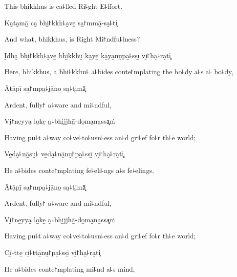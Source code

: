 \begin{english}
  This bhikkhus is ca꜕lled Ri꜕ght E꜕ffort.
\end{english}

Ka̮ta̮mā̱ ca̮ bhi̱꜓kkh꜕a̮ve̱ sa̱꜓mmā̱-sa̮꜕ti͓

\begin{english}
  And what, bhikkhus, is Right Mi꜓ndfu꜕lness?
\end{english}

I̮dha̮ bhi̱꜓kkh꜕a̮ve̱ bhi̱kkhu̮ kā̱ye̱ kā̱yā̱nu̮pa̱꜕ssī̱ vi̮꜓ha̮꜕ra̮ti͓

\begin{english}
  Here, bhikkhus, a bhi꜕kkhu꜕ a꜕bides conte꜓mplating the bo꜕dy a꜕s a꜕ bo꜕dy,
\end{english}

Ā̱tā̱pī̱ sa̱꜓mpa̮꜕jā̱no̱ sa̮꜕ti̮mā͓

\begin{english}
  Ardent, fully꜓ a꜕ware and mi꜕ndful,
\end{english}

Vi̮꜓ne̱yya̮ lo̱ke̱ a̮꜕bhi̱jjhā̱-do̱ma̮na̱ssa͓ṁ

\begin{english}
  Having pu꜕t a꜕way co꜕ve꜕to꜕usn꜕ess an꜕d gri꜕ef fo꜕r th꜕e world;
\end{english}

Ve̱da̮꜕nā̱su̮꜕ ve̱da̮꜕nā̱nu̮꜓pa̱꜕ssī̱ vi̮꜓ha̮꜕ra̮ti͓

\begin{english}
  He a꜕bides conte꜓mplating fe꜕eli꜕ngs a꜕s fe꜕elings,
\end{english}

\ifaivedition
\clearpage
\fi

Ā̱tā̱pī̱ sa̱꜓mpa̮꜕jā̱no̱ sa̮꜕ti̮mā͓

\begin{english}
  Ardent, fully꜓ a꜕ware and mi꜕ndful,
\end{english}

Vi̮꜓ne̱yya̮ lo̱ke̱ a̮꜕bhi̱jjhā̱-do̱ma̮na̱ssa͓ṁ

\begin{english}
  Having pu꜕t a꜕way co꜕ve꜕to꜕usn꜕ess an꜕d gri꜕ef fo꜕r th꜕e world;
\end{english}

Ci̱꜕tte̱ ci̱꜕ttā̱nu̮꜓pa̱꜕ssī̱ vi̮꜓ha̮꜕ra̮ti͓

\begin{english}
  He a꜕bides conte꜓mplating mi꜕nd a꜕s mind,
\end{english}

